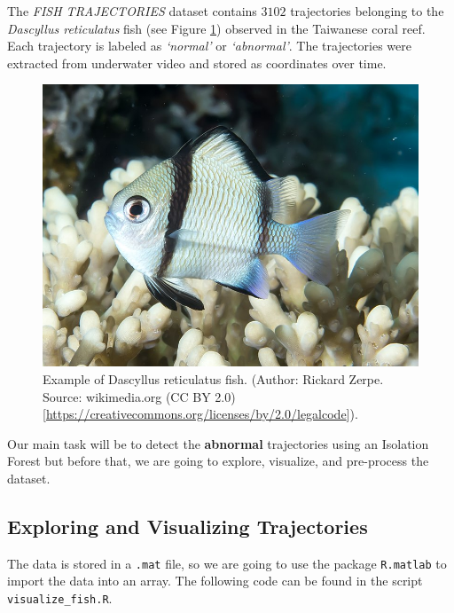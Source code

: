 \documentclass[
  11pt,
]{krantz}
\newenvironment{Shaded}{\begin{snugshade}}{\end{snugshade}}
\newcommand{\CommentTok}[1]{\textcolor[rgb]{0.37,0.37,0.37}{\textit{#1}}}
\newcommand{\ErrorTok}[1]{\textcolor[rgb]{0.14,0.14,0.14}{\textbf{#1}}}
\newcommand{\FunctionTok}[1]{\textcolor[rgb]{0,0,0}{#1}}
\newcommand{\NormalTok}[1]{#1}
\newcommand{\OtherTok}[1]{\textcolor[rgb]{0.37,0.37,0.37}{#1}}
\newcommand{\SpecialCharTok}[1]{\textcolor[rgb]{0,0,0}{#1}}
\newcommand{\StringTok}[1]{\textcolor[rgb]{0.5,0.5,0.5}{#1}}
\begin{document}
The \emph{FISH TRAJECTORIES} dataset contains \(3102\) trajectories belonging to the \emph{Dascyllus reticulatus} fish (see Figure \ref{fig:dascyllus}) observed in the Taiwanese coral reef. Each trajectory is labeled as \emph{`normal'} or \emph{`abnormal'}. The trajectories were extracted from underwater video and stored as coordinates over time.



\begin{figure}

{\centering \includegraphics[width=0.45\linewidth]{images/dascyllus_reticulatus} 

}

\caption{Example of Dascyllus reticulatus fish. (Author: Rickard Zerpe. Source: wikimedia.org (CC BY 2.0) {[}\url{https://creativecommons.org/licenses/by/2.0/legalcode}{]}).}\label{fig:dascyllus}
\end{figure}

Our main task will be to detect the \textbf{abnormal} trajectories using an Isolation Forest but before that, we are going to explore, visualize, and pre-process the dataset.

\hypertarget{exploring-and-visualizing-trajectories}{%
\subsection{Exploring and Visualizing Trajectories}\label{exploring-and-visualizing-trajectories}}

The data is stored in a \texttt{.mat} file, so we are going to use the package \texttt{R.matlab} \citep{rmatlab} to import the data into an array. The following code can be found in the script \texttt{visualize\_fish.R}.

\begin{Shaded}
\end{Shaded}
\end{document}
